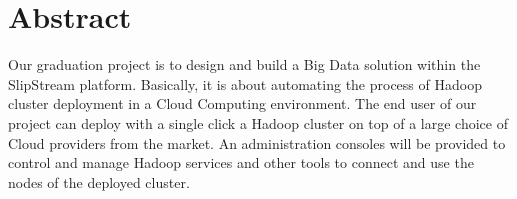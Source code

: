 \chapter*{Abstract}

Our graduation project is to design and build a Big Data solution within the SlipStream platform. Basically, it is about automating the process of Hadoop cluster deployment in a Cloud Computing environment. The end user of our project can deploy with a single click a Hadoop cluster on top of a large choice of Cloud providers from the market. An administration consoles will be provided to control and manage Hadoop services and other tools to connect and use the nodes of the deployed cluster.